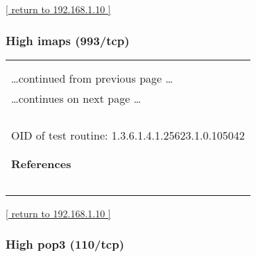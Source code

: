 \documentclass{article}
\begin{document}
\begin{footnotesize}\hyperref[host:192.168.1.10]{[ return to 192.168.1.10 ]}\end{footnotesize}
\subsubsection{High imaps (993/tcp)}
\label{port:192.168.1.10 imaps (993/tcp) High}

\begin{longtable}{|p{}|}
\hline
\rowcolor{openvas_hole}{\color{white}{High (CVSS: 6.8) }}\\
\rowcolor{openvas_hole}{\color{white}{NVT: OpenSSL CCS Man in the Middle Security Bypass Vulnerability}}\\
\hline
\endfirsthead
\hfill\ldots continued from previous page \ldots \\
\hline
\endhead
\hline
\ldots continues on next page \ldots \\
\endfoot
\hline
\endlastfoot
\\
\rowcolor{white}{\verb==}\\
\rowcolor{white}{\verb==}\\
\\
OID of test routine: 1.3.6.1.4.1.25623.1.0.105042\\
\\

      \hline
      \\
\textbf{References}\\
\rowcolor{white}{\verb=CVE: CVE-2014-0224=}\\
\rowcolor{white}{\verb=BID:67899=}\\
\rowcolor{white}{\verb=Other:=}\\
\rowcolor{white}{\verb=  URL:http://www.securityfocus.com/bid/67899=}\\
\rowcolor{white}{\verb=   URL:http://openssl.org/=}\\
\end{longtable}

\begin{footnotesize}\hyperref[host:192.168.1.10]{[ return to 192.168.1.10 ]}\end{footnotesize}
\subsubsection{High pop3 (110/tcp)}
\label{port:192.168.1.10 pop3 (110/tcp) High}
\end{document}
